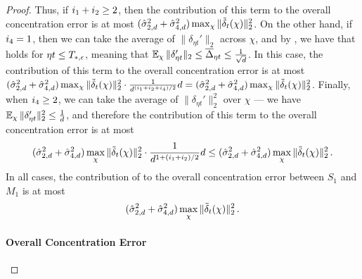 \begin{proof}
Thus, if $i_{1} + i_{2} \geq 2$, then the contribution of this term to the overall concentration error is at most $(\hat{\sigma}_{2, d}^2 + \hat{\sigma}_{4, d}^2) \max_\chi \|{\tilde{\delta}}_t(\chi)\|_2^2$. On the other hand, if $i_{4} = 1$, then we can take the average of $\|\delta_{\eta t}'\|_2$ across $\chi$, and by , we have that  holds for $\eta t \leq T_{*, \epsilon}$, meaning that $\operatorname*{\mathbb{E}}_\chi \|\delta_{\eta t}'\|_2 \leq \overline{\Delta}_{\eta t} \leq \frac{1}{\sqrt{d}}$. In this case, the contribution of this term to the overall concentration error is at most $(\hat{\sigma}_{2, d}^2 + \hat{\sigma}_{4, d}^2) \max_\chi \|{\tilde{\delta}}_t(\chi)\|_2^2 \cdot \frac{1}{d^{(i_{1} + i_{2} + i_{4})/2}} d = (\hat{\sigma}_{2, d}^2 + \hat{\sigma}_{4, d}^2) \max_\chi \|{\tilde{\delta}}_t(\chi)\|_2^2$. Finally, when $i_{4} \geq 2$, we can take the average of $\|\delta_{\eta t}'\|_2^2$ over $\chi$ --- we have $\operatorname*{\mathbb{E}}_\chi \|\delta_{\eta t}'\|_2^2 \leq \frac{1}{d}$, and therefore the contribution of this term to the overall concentration error is at most
\begin{align}
(\hat{\sigma}_{2, d}^2 + \hat{\sigma}_{4, d}^2) \max_\chi \|{\tilde{\delta}}_t(\chi)\|_2^2 \cdot \frac{1}{d^{1 + (i_{1} + i_{2})/2}} d
\leq (\hat{\sigma}_{2, d}^2 + \hat{\sigma}_{4, d}^2) \max_\chi \|{\tilde{\delta}}_t(\chi)\|_2^2 \,.
\end{align}
In all cases, the contribution of  to the overall concentration error between $S_1$ and $M_1$ is at most 
\begin{align}
(\hat{\sigma}_{2, d}^2 + \hat{\sigma}_{4, d}^2) \max_\chi \|{\tilde{\delta}}_t(\chi)\|_2^2 \,.
\end{align}
\paragraph{Overall Concentration Error}


\end{proof}
